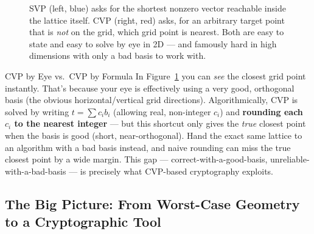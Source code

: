 \begin{figure}[ht]
\centering
{}
\caption{SVP (left, blue) asks for the shortest nonzero vector reachable inside the lattice itself. CVP (right, red) asks, for an arbitrary target point that is \emph{not} on the grid, which grid point is nearest. Both are easy to state and easy to solve by eye in 2D --- and famously hard in high dimensions with only a bad basis to work with.}
\label{fig:svp-cvp}
\end{figure}

\begin{exbox}{CVP by Eye vs.\ CVP by Formula}
In Figure~\ref{fig:svp-cvp} you can \emph{see} the closest grid point instantly. That's because your eye is effectively using a very good, orthogonal basis (the obvious horizontal/vertical grid directions). Algorithmically, CVP is solved by writing $t = \sum c_i b_i$ (allowing real, non-integer $c_i$) and \textbf{rounding each $c_i$ to the nearest integer} --- but this shortcut only gives the \emph{true} closest point when the basis is good (short, near-orthogonal). Hand the exact same lattice to an algorithm with a bad basis instead, and naive rounding can miss the true closest point by a wide margin. This gap --- correct-with-a-good-basis, unreliable-with-a-bad-basis --- is precisely what CVP-based cryptography exploits.
\end{exbox}

\subsection{The Big Picture: From Worst-Case Geometry to a Cryptographic Tool}
\label{sec:L2:the-big-picture-from-worst-case-geometry}


